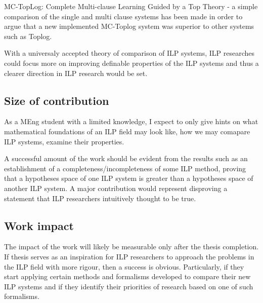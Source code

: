 MC-TopLog: Complete Multi-clause Learning Guided by a Top Theory - a simple comparison of the single and multi clause systems has been made in order to argue that a new implemented MC-Toplog system was superior to other systems such as Toplog.

With a universaly accepted theory of comparison of ILP systems, ILP researches could focus more on improving definable properties of the ILP systems and thus a clearer direction in ILP research would be set.

\subsection{Size of contribution}
As a MEng student with a limited knowledge, I expect to only give hints on what mathematical foundations of an ILP field may look like, how we may comapare ILP systems, examine their properties.

A successful amount of the work should be evident from the results such as an establishment of a completeness/incompleteness of some ILP method, proving that a hypotheses space of one ILP system is greater than a hypotheses space of another ILP system. A major contribution would represent disproving a statement that ILP researchers intuitively thought to be true.

\subsection{Work impact}
The impact of the work will likely be measurable only after the thesis completion. If thesis serves as an inspiration for ILP researchers to approach the problems in the ILP field with more rigour, then a success is obvious. Particularly, if they start applying certain methods and formalisms developed to compare their new ILP systems and if they identify their priorities of research based on one of such formalisms.
